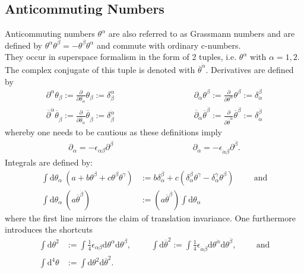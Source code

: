 \subsection{Anticommuting Numbers}\label{sec:AnticommNumbers}
Anticommuting numbers $\theta^\alpha$ are also referred to as Grassmann numbers and are defined by $\theta^\alpha\theta^\beta = -\theta^\beta\theta^\alpha$ and commute with ordinary c-numbers.\\
They occur in superspace formalism in the form of 2 tuples, i.e. $\theta^\alpha$ with $\alpha=1,2$. The complex conjugate of this tuple is denoted with $\overline{\theta}^{\dot{\alpha}}$. 
Derivatives are defined by
\begin{align}
\partial^\alpha \theta_\beta := \frac{\partial}{\partial \theta_\alpha} \theta_\beta := \delta^\alpha_\beta \hspace{4cm} \partial_\alpha \theta^\beta := \frac{\partial}{\partial \theta^\alpha} \theta^\beta := \delta_\alpha^\beta\nonumber\\
\overline{\partial}^{\dot{\alpha}} \overline{\theta}_{\dot{\beta}} := \frac{\partial}{\partial \overline{\theta}_{\dot{\alpha}}} \overline{\theta}_{\dot{\beta}} := \delta^{\dot{\alpha}}_{\dot{\beta}} \hspace{4cm} \overline{\partial}_{\dot{\alpha}} \overline{\theta}^{\dot{\beta}} := \frac{\partial}{\partial \overline{\theta}^{\dot{\alpha}}} \overline{\theta}^{\dot{\beta}} := \delta_{\dot{\alpha}}^{\dot{\beta}}
\end{align}
whereby one needs to be cautious as these definitions imply
\begin{align}
\partial_\alpha = -\epsilon_{\alpha\beta}\partial^\beta \hspace{4cm} \partial_{\dot{\alpha}} = -\epsilon_{\dot{\alpha}\dot{\beta}}\partial^{\dot{\beta}}.
\end{align}
Integrals are defined by:
\begin{align}
\int\mathrm{d}\theta_\alpha\ (a+b \theta^\beta + c\theta^\beta \theta^\gamma) &:= b\delta_{\alpha}^{\beta} + c (\delta_\alpha^\beta \theta^\gamma - \delta_\alpha^\gamma \theta^\beta) \hspace{1cm} \mathrm{and} \nonumber\\
\int\mathrm{d}\theta_\alpha\ (a\overline{\theta}^{\dot{\beta}}) &:= (a\overline{\theta}^{\dot{\beta}}) \int\mathrm{d}\theta_\alpha\
\end{align}
where the first line mirrors the claim of translation invariance. One furthermore introduces the shortcuts
\begin{align}
\int \mathrm{d}\theta^2 &:= \int\frac{1}{4}\epsilon_{\alpha\beta} \mathrm{d}\theta^\alpha\mathrm{d}\theta^\beta, \hspace{1cm}
\int \mathrm{d}\overline{\theta}^2 := \int\frac{1}{4}\epsilon_{\dot{\alpha}\dot{\beta}} \mathrm{d}\theta^{\dot{\alpha}}\mathrm{d}\theta^{\dot{\beta}}, \hspace{1cm} \mathrm{and} \nonumber\\
\int \mathrm{d}^4\theta &:= \int \mathrm{d}\theta^2\mathrm{d}\overline{\theta}^2.
\end{align}
